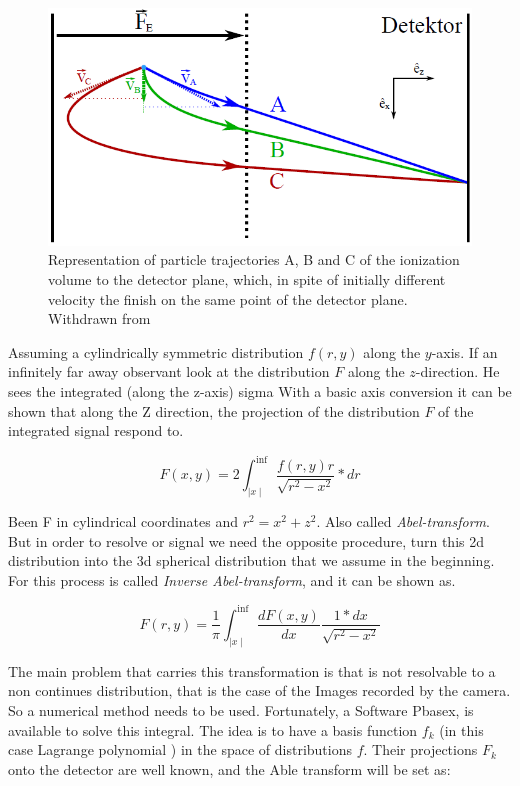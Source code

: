 \begin{figure}[hbtp]
\label{ing:vmiVelcDist}
\caption{Representation of particle trajectories A, B and C of the ionization volume to the detector plane, which, in spite of initially different velocity the finish on the same point of the detector plane. Withdrawn from \cite{fechner_lutz_aufbau_2011}}
\centering
\includegraphics[width=8 cm]{../Images/cel distrub vmi.png}
\end{figure}
Assuming a cylindrically symmetric distribution $f(r,y)$ along the $y$-axis. If an infinitely far away observant look at the distribution $F$ along the $z$-direction.  He sees the integrated (along the z-axis) sigma
With a basic axis conversion it can be shown that along the Z direction, the projection of the distribution $F$ of the integrated signal respond to.

\begin{equation}
F(x,y)=2\int^{\inf}_{\mid x\mid} \dfrac{f(r,y)r}{\sqrt{r^{2}-x^{2}}}*dr 
\end{equation}

Been F in cylindrical coordinates and $r^{2}=x^{2}+z^{2}$. Also called \textit{Abel-transform}.
But in order to resolve or signal we need the opposite procedure, turn this 2d distribution into the 3d spherical distribution that we assume in the beginning. For this process is called \textit{Inverse Abel-transform}, and it can be shown as.
 
\begin{equation}
F(r,y)=\dfrac{1}{\pi} \int^{\inf}_{\mid x\mid} \dfrac{dF(x,y)}{dx} \dfrac{1*dx}{\sqrt{r^{2}-x^{2}}} 
\end{equation}

The main problem that carries this transformation is that is not resolvable to a non continues distribution, that is the case of the Images recorded by the camera. So a  numerical method needs to be used.
Fortunately, a Software Pbasex, is available to solve this integral. The  idea  is  to  have a basis function $f_{k}$ (in this case Lagrange polynomial ) in the space of distributions $f$.  Their projections $F_{k}$ onto the detector are well known, and the Able transform will be set as:

